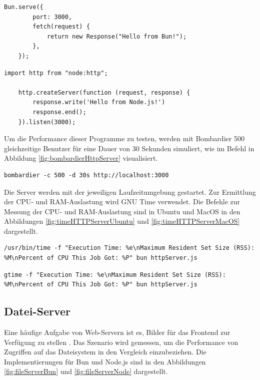 \begin{lstlisting}[caption={HTTP-Server Bun},label={fig:httpServerBun}]
	Bun.serve({
		port: 3000,
		fetch(request) {
			return new Response("Hello from Bun!");
		},
	});
\end{lstlisting}

\begin{lstlisting}[caption={HTTP-Server Node.js},label={fig:httpServerNode}]
	import http from "node:http";
	
	http.createServer(function (request, response) {
		response.write('Hello from Node.js!')
		response.end();
	}).listen(3000);
\end{lstlisting}

\noindent
Um die Performance dieser Programme zu testen, werden mit Bombardier 500 gleichzeitige Benutzer für eine Dauer von 30 Sekunden simuliert, wie im Befehl in Abbildung \ref{fig:bombardierHttpServer} visualisiert.
\begin{lstlisting}[caption={Bombardier HTTP-Server},label={fig:bombardierHttpServer}]
	bombardier -c 500 -d 30s http://localhost:3000
\end{lstlisting}

\noindent
Die Server werden mit der jeweiligen Laufzeitumgebung gestartet. Zur Ermittlung der CPU- und RAM-Auslastung wird GNU Time verwendet. Die Befehle zur Messung der CPU- und RAM-Auslastung sind in Ubuntu und MacOS in den Abbildungen \ref{fig:timeHTTPServerUbuntu} und \ref{fig:timeHTTPServerMacOS} dargestellt.

\begin{lstlisting}[caption={CPU- und RAM-Messung auf Ubuntu},label={fig:timeHTTPServerUbuntu}]
	/usr/bin/time -f "Execution Time: %e\nMaximum Resident Set Size (RSS): %M\nPercent of CPU This Job Got: %P" bun httpServer.js
\end{lstlisting}

\begin{lstlisting}[caption={CPU- und RAM-Messung auf MacOS},label={fig:timeHTTPServerMacOS}]
	gtime -f "Execution Time: %e\nMaximum Resident Set Size (RSS): %M\nPercent of CPU This Job Got: %P" bun httpServer.js
\end{lstlisting}

\subsection{Datei-Server} \label{subsec:fileServer}
Eine häufige Aufgabe von Web-Servern ist es, Bilder für das Frontend zur Verfügung zu stellen . Das Szenario wird gemessen, um die Performance von Zugriffen auf das Dateisystem in den Vergleich einzubeziehen. \newline
Die Implementierungen für Bun und Node.js sind in den Abbildungen \ref{fig:fileServerBun} und \ref{fig:fileServerNode} dargestellt.

